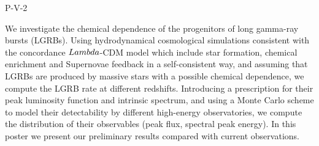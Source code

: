 P-V-2


\bigskip



\bigskip

\noindent We investigate the chemical dependence of the progenitors of long gamma-ray bursts (LGRBs). Using hydrodynamical cosmological simulations consistent with the concordance $\\Lambda$-CDM model which include star formation, chemical enrichment and Supernovae feedback in a self-consistent way, and assuming that LGRBs are produced by massive stars with a possible chemical dependence, we compute the LGRB rate at different redshifts. Introducing a prescription for their peak luminosity function and intrinsic spectrum, and using a Monte Carlo scheme to model their detectability by different high-energy observatories, we compute the distribution of their observables (peak flux, spectral peak energy). In this poster we present our preliminary results compared with current observations.
